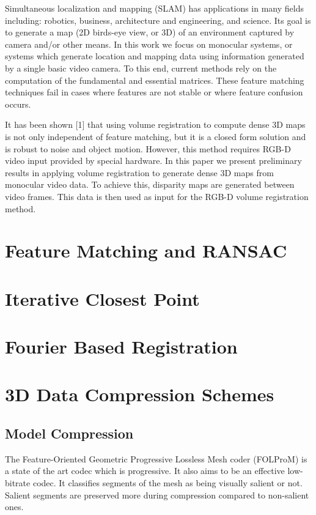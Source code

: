 Simultaneous localization and mapping (SLAM) has applications in many fields including: robotics, business, architecture and engineering, and science. Its goal is to generate a map (2D birds-eye view, or 3D) of an environment captured by camera and/or other means. In this work we focus on monocular systems, or systems which generate location and mapping data using information generated by a single basic video camera. To this end, current methods rely on the computation of the fundamental and essential matrices. These feature matching techniques fail in cases where features are not stable or where feature confusion occurs. 

It has been shown [1] that using volume registration to compute dense 3D maps is not only independent of feature matching, but it is a closed form solution and is robust to noise and object motion. However, this method requires RGB-D video input provided by special hardware. In this paper we present preliminary results in applying volume registration to generate dense 3D maps from monocular video data. To achieve this, disparity maps are generated between video frames. This data is then used as input for the RGB-D volume registration method.

\section{Feature Matching and RANSAC}

\section{Iterative Closest Point}

\section{Fourier Based Registration}

\section{3D Data Compression Schemes}

\subsection{Model Compression}

The Feature-Oriented Geometric Progressive Lossless Mesh coder (FOLProM) \cite{Peng10Feature} is a state of the art codec which is progressive. It also aims to be an effective low-bitrate codec. It classifies segments of the mesh as being visually salient or not. Salient segments are preserved more during compression compared to non-salient ones. \\

